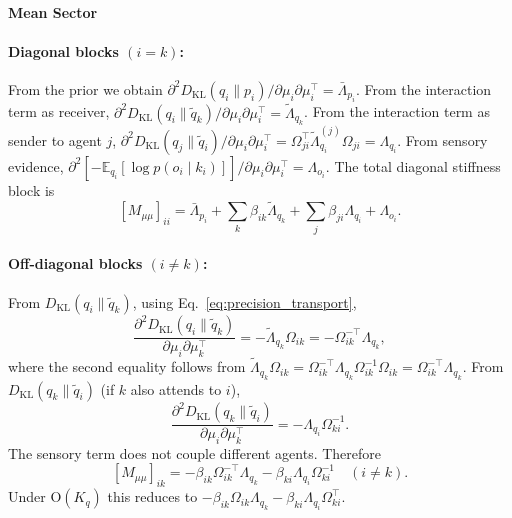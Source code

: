 \paragraph{Mean Sector}

\paragraph{Diagonal blocks $(i = k)$:} From the prior we obtain $\partial^2 D_{\mathrm{KL}}(q_i \| p_i)/\partial \mu_i \partial \mu_i^\top = \bar{\Lambda}_{p_i}$. From the interaction term as receiver, $\partial^2 D_{\mathrm{KL}}(q_i \| \tilde{q}_k)/\partial \mu_i \partial \mu_i^\top = \tilde{\Lambda}_{q_k}$. From the interaction term as sender to agent $j$, $\partial^2 D_{\mathrm{KL}}(q_j \| \tilde{q}_i)/\partial \mu_i \partial \mu_i^\top = \Omega_{ji}^\top \tilde{\Lambda}_{q_i}^{(j)} \Omega_{ji} = \Lambda_{q_i}$. From sensory evidence, $\partial^2[-\mathbb{E}_{q_i}[\log p(o_i \mid k_i)]]/\partial \mu_i \partial \mu_i^\top = \Lambda_{o_i}$. The total diagonal stiffness block is
\begin{equation}
\boxed{[M_{\mu\mu}]_{ii} = \bar{\Lambda}_{p_i} + \sum_k \beta_{ik} \tilde{\Lambda}_{q_k} + \sum_j \beta_{ji} \Lambda_{q_i} + \Lambda_{o_i}.}
\label{eq:mass_mu_diagonal}
\end{equation}

\paragraph{Off-diagonal blocks $(i \neq k)$:} From $D_{\mathrm{KL}}(q_i \| \tilde{q}_k)$, using Eq.~\eqref{eq:precision_transport},
\begin{equation}
\frac{\partial^2 D_{\mathrm{KL}}(q_i \| \tilde{q}_k)}{\partial \mu_i \partial \mu_k^\top} = -\tilde{\Lambda}_{q_k}\Omega_{ik} = -\Omega_{ik}^{-\top}\Lambda_{q_k},
\end{equation}
where the second equality follows from $\tilde{\Lambda}_{q_k}\Omega_{ik} = \Omega_{ik}^{-\top}\Lambda_{q_k}\Omega_{ik}^{-1}\Omega_{ik} = \Omega_{ik}^{-\top}\Lambda_{q_k}$. From $D_{\mathrm{KL}}(q_k \| \tilde{q}_i)$ (if $k$ also attends to $i$),
\begin{equation}
\frac{\partial^2 D_{\mathrm{KL}}(q_k \| \tilde{q}_i)}{\partial \mu_i \partial \mu_k^\top} = -\Lambda_{q_i}\Omega_{ki}^{-1}.
\end{equation}
The sensory term does not couple different agents. Therefore
\begin{equation}
\boxed{[M_{\mu\mu}]_{ik} = -\beta_{ik}\Omega_{ik}^{-\top}\Lambda_{q_k} - \beta_{ki}\Lambda_{q_i}\Omega_{ki}^{-1} \quad (i \neq k).}
\label{eq:mass_mu_offdiagonal}
\end{equation}
Under $\mathrm{O}(K_q)$ this reduces to $-\beta_{ik}\Omega_{ik}\Lambda_{q_k} - \beta_{ki}\Lambda_{q_i}\Omega_{ki}^\top$.

